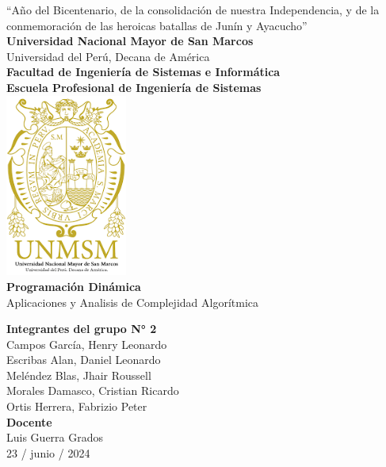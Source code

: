 \begin{titlepage}
	\begin{center}
		{\large “Año del Bicentenario, de la consolidación de nuestra Independencia, y de la conmemoración de las heroicas batallas de Junín y Ayacucho”}\\
		\textbf{\large Universidad Nacional Mayor de San Marcos}\\
		{\large Universidad del Perú, Decana de América}\\
		\textbf{\large Facultad de Ingeniería de Sistemas e Informática}\\
		\textbf{\large Escuela Profesional de Ingeniería de Sistemas}\\
		\vspace{0.5cm}
		\includegraphics[height=6cm]{unmsm.png}\\ %
		\textbf{\large Programación Dinámica}\\
		{\large Aplicaciones y Analisis de Complejidad Algorítmica}\\
	\end{center}
	\begin{center}
		\textbf{\large Integrantes del grupo N° 2}\\
		\vspace{0.5cm}
		{\large Campos García, Henry Leonardo}\\
		\vspace{0.3cm}
		{\large Escribas Alan, Daniel Leonardo}\\
		\vspace{0.3cm}
		{\large Meléndez Blas, Jhair Roussell}\\
		\vspace{0.3cm}
		{\large Morales Damasco, Cristian Ricardo}\\
		\vspace{0.3cm}
		{\large Ortis Herrera, Fabrizio Peter}\\
		\vspace{0.3cm}
		\textbf{\large Docente}\\
		{\large Luis Guerra Grados}\\
		\vspace{1cm}
		{\large 23 / junio / 2024}
	\end{center}
\end{titlepage}
